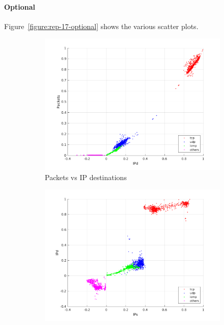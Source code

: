 \documentclass{article}
\begin{document}

\paragraph{Optional}

Figure~\ref{figure:rep-17-optional} shows the various scatter plots.

\begin{figure}[h]
    \begin{subfigure}{.5\textwidth}
        \centering
        \includegraphics[width=\textwidth]{../exercise-3/plots/rep_17_optional_IPdPackets.png}
        \caption{Packets vs IP destinations}
    \end{subfigure}
    \begin{subfigure}{.5\textwidth}
        \centering
        \includegraphics[width=\textwidth]{../exercise-3/plots/rep_17_optional_IPsIPd.png}

\end{subfigure}
\end{figure}
\end{document}
